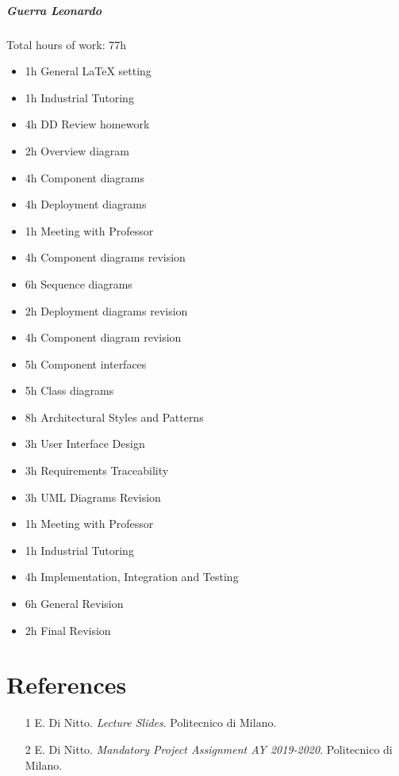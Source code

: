\documentclass{report}
\newcommand{\ic}[1]{\textit{#1}}
\begin{document}
		\paragraph{Guerra Leonardo} Total hours of work: 77h
			\begin{itemize}
				\item 1h General LaTeX setting
				\item 1h Industrial Tutoring
				\item 4h DD Review homework
				\item 2h Overview diagram
				\item 4h Component diagrams
				\item 4h Deployment diagrams
				\item 1h Meeting with Professor
				\item 4h Component diagrams revision
				\item 6h Sequence diagrams
				\item 2h Deployment diagrams revision
				\item 4h Component diagram revision
				\item 5h Component interfaces
				\item 5h Class diagrams
				\item 8h Architectural Styles and Patterns
				\item 3h User Interface Design
				\item 3h Requirements Traceability
				\item 3h UML Diagrams Revision
				\item 1h Meeting with Professor
				\item 1h Industrial Tutoring
				\item 4h Implementation, Integration and Testing
				\item 6h General Revision
				\item 2h Final Revision
				
			\end{itemize}
	\chapter{References}
	\thispagestyle{fancy}
	\begin{itemize}
				\item[1]E. Di Nitto. \ic{Lecture Slides}. Politecnico di Milano.
				\item[2]E. Di Nitto. \ic{Mandatory Project Assignment AY 2019-2020}. Politecnico di Milano.
	\end{itemize}
	
\end{document}
